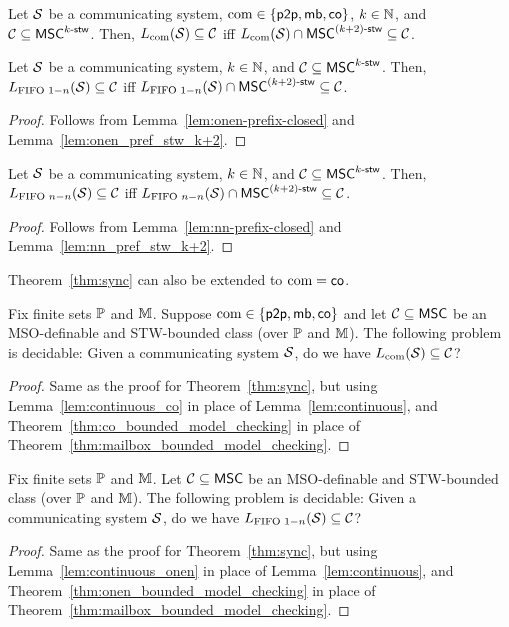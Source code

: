 \begin{lemma}\label{lem:continuous_co}
Let $\mathcal{S}$ be a communicating system, $\textup{com} \in \{\mathsf{p2p}, \mathsf{mb}, \mathsf{co}\}$,
$k \in \mathbb{N}$, and $\mathcal{C} \subseteq \mathsf{MSC}^{k\textup{-}\mathsf{stw}}$.
Then, $L_{\textup{com}}(\mathcal{S}) \subseteq \mathcal{C}$ iff
$L_{\textup{com}}(\mathcal{S}) \cap \mathsf{MSC}^{(k+2)\textup{-}\mathsf{stw}} \subseteq \mathcal{C}$.
\end{lemma}

\begin{lemma}\label{lem:continuous_onen}
Let $\mathcal{S}$ be a communicating system,
$k \in \mathbb{N}$, and $\mathcal{C} \subseteq \mathsf{MSC}^{k\textup{-}\mathsf{stw}}$.
Then, $L_{\text{FIFO } 1\mathsf{-}n}(\mathcal{S}) \subseteq \mathcal{C}$ iff
$L_{\text{FIFO } 1\mathsf{-}n}(\mathcal{S}) \cap \mathsf{MSC}^{(k+2)\textup{-}\mathsf{stw}} \subseteq \mathcal{C}$.
\end{lemma}
\begin{proof}
	Follows from Lemma~\ref{lem:onen-prefix-closed} and Lemma~\ref{lem:onen_pref_stw_k+2}.
\end{proof}

\begin{lemma}\label{lem:continuous_nn}
Let $\mathcal{S}$ be a communicating system,
$k \in \mathbb{N}$, and $\mathcal{C} \subseteq \mathsf{MSC}^{k\textup{-}\mathsf{stw}}$.
Then, $L_{\text{FIFO } n\mathsf{-}n}(\mathcal{S}) \subseteq \mathcal{C}$ iff
$L_{\text{FIFO } n\mathsf{-}n}(\mathcal{S}) \cap \mathsf{MSC}^{(k+2)\textup{-}\mathsf{stw}} \subseteq \mathcal{C}$.
\end{lemma}
\begin{proof}
	Follows from Lemma~\ref{lem:nn-prefix-closed} and Lemma~\ref{lem:nn_pref_stw_k+2}.
\end{proof}

Theorem~\ref{thm:sync} can also be extended to $\textup{com} = \mathsf{co}$.

\begin{theorem}\label{thm:sync_co}
Fix finite sets $\mathbb{P}$ and $\mathbb{M}$.
Suppose $\textup{com} \in \{\mathsf{p2p}, \mathsf{mb},\mathsf{co}\}$ and let $\mathcal{C} \subseteq \mathsf{MSC}$ be an MSO-definable and STW-bounded class (over $\mathbb{P}$ and $\mathbb{M}$).
The following problem is decidable:
Given a communicating system $\mathcal{S}$, do we have $L_{\textup{com}}(\mathcal{S}) \subseteq \mathcal{C}$?
\end{theorem}
\begin{proof}
Same as the proof for Theorem~\ref{thm:sync}, but using Lemma~\ref{lem:continuous_co} in place of Lemma~\ref{lem:continuous}, and Theorem~\ref{thm:co_bounded_model_checking} in place of Theorem~\ref{thm:mailbox_bounded_model_checking}.
\end{proof}

\begin{theorem}\label{thm:sync_onen}
Fix finite sets $\mathbb{P}$ and $\mathbb{M}$.
Let $\mathcal{C} \subseteq \mathsf{MSC}$ be an MSO-definable and STW-bounded class (over $\mathbb{P}$ and $\mathbb{M}$).
The following problem is decidable:
Given a communicating system $\mathcal{S}$, do we have $L_{\text{FIFO } 1\mathsf{-}n}(\mathcal{S}) \subseteq \mathcal{C}$?
\end{theorem}
\begin{proof}
Same as the proof for Theorem~\ref{thm:sync}, but using Lemma~\ref{lem:continuous_onen} in place of Lemma~\ref{lem:continuous}, and Theorem~\ref{thm:onen_bounded_model_checking} in place of Theorem~\ref{thm:mailbox_bounded_model_checking}.
\end{proof}

